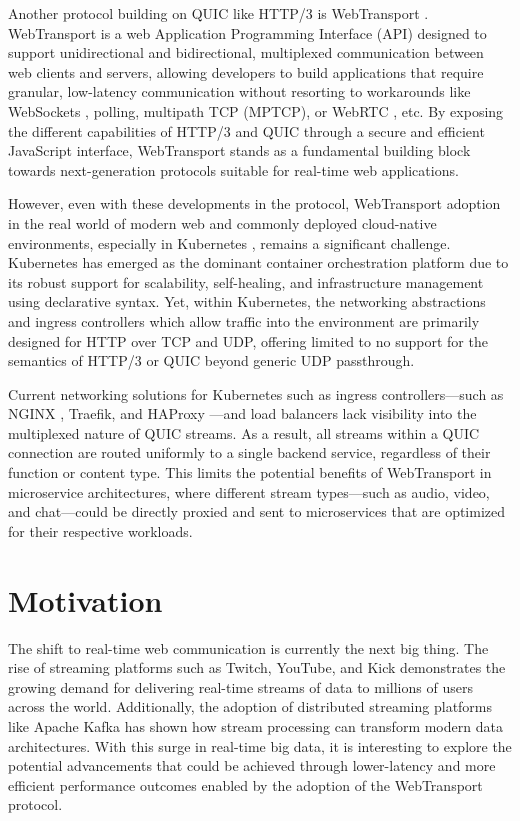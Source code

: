 Another protocol building on QUIC like HTTP/3 is WebTransport \cite{webtransport-draft}. WebTransport \cite{webtransport-mdn} is a web Application Programming Interface (API) designed to support unidirectional and bidirectional, multiplexed communication between web clients and servers, allowing developers to build applications that require granular, low-latency communication without resorting to workarounds like WebSockets \cite{rfc6455}, polling, multipath TCP (MPTCP), or WebRTC \cite{webrtc}, etc. By exposing the different capabilities of HTTP/3 \cite{marx2021-http3} and QUIC through a secure and efficient JavaScript interface, WebTransport stands as a fundamental building block towards next-generation protocols suitable for real-time web applications.

However, even with these developments in the protocol, WebTransport adoption in the real world of modern web and commonly deployed cloud-native environments, especially in Kubernetes \cite{kubernetes-docs}, remains a significant challenge. Kubernetes has emerged as the dominant container orchestration platform \cite{kubernetes-networking} due to its robust support for scalability, self-healing, and infrastructure management using declarative syntax. Yet, within Kubernetes, the networking abstractions and ingress controllers which allow traffic into the environment are primarily designed for HTTP over TCP and UDP, offering limited to no support for the semantics of HTTP/3 or QUIC beyond generic UDP passthrough.

Current networking solutions for Kubernetes such as ingress controllers—such as NGINX \cite{nginx-ingress-docs}, Traefik, and HAProxy \cite{haproxy-k8s-docs}—and load balancers lack visibility into the multiplexed nature of QUIC streams. As a result, all streams within a QUIC connection are routed uniformly to a single backend service, regardless of their function or content type. This limits the potential benefits of WebTransport in microservice architectures, where different stream types—such as audio, video, and chat—could be directly proxied and sent to microservices that are optimized for their respective workloads.




\section{Motivation}

The shift to real-time web communication is currently the next big thing. The rise of streaming platforms such as Twitch, YouTube, and Kick demonstrates the growing demand for delivering real-time streams of data to millions of users across the world. Additionally, the adoption of distributed streaming platforms like Apache Kafka \cite{kreps2011} has shown how stream processing can transform modern data architectures. With this surge in real-time big data, it is interesting to explore the potential advancements that could be achieved through lower-latency and more efficient performance outcomes enabled by the adoption of the WebTransport protocol.


